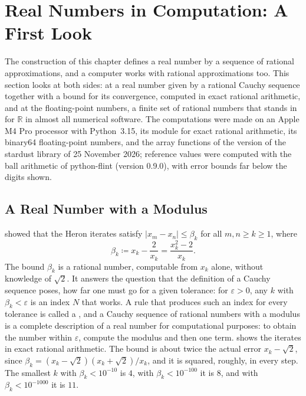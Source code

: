 \section{Real Numbers in Computation: A First Look}
\label{sec:real-computation}

The construction of this chapter defines a real number by a sequence of rational approximations, and a computer works with rational approximations too. This section looks at both sides: at a real number given by a rational Cauchy sequence together with a bound for its convergence, computed in exact rational arithmetic, and at the floating-point numbers, a finite set of rational numbers that stands in for $\mathbb R$ in almost all numerical software. The computations were made on an Apple M4 Pro processor with Python~3.15, its module  for exact rational arithmetic, its binary64 floating-point numbers, and the array functions of the version of the stardust library of 25 November 2026; reference values were computed with the ball arithmetic of python-flint (version 0.9.0), with error bounds far below the digits shown.

\subsection{A Real Number with a Modulus}

 showed that the Heron iterates satisfy $|x_m-x_n|\le\beta_k$ for all $m,n\ge k\ge1$, where
\[
\beta_k\coloneqq x_k-\frac2{x_k}=\frac{x_k^2-2}{x_k} .
\]
The bound $\beta_k$ is a rational number, computable from $x_k$ alone, without knowledge of $\sqrt2$. It answers the question that the definition of a Cauchy sequence poses, how far one must go for a given tolerance: for $\varepsilon>0$, any $k$ with $\beta_k<\varepsilon$ is an index $N$ that works. A rule that produces such an index for every tolerance is called a , and a Cauchy sequence of rational numbers with a modulus is a complete description of a real number for computational purposes: to obtain the number within $\varepsilon$, compute the modulus and then one term.  shows the iterates in exact rational arithmetic. The bound is about twice the actual error $x_k-\sqrt2$, since $\beta_k=(x_k-\sqrt2)(x_k+\sqrt2)/x_k$, and it is squared, roughly, in every step. The smallest $k$ with $\beta_k<10^{-10}$ is $4$, with $\beta_k<10^{-100}$ it is $8$, and with $\beta_k<10^{-1000}$ it is $11$.

